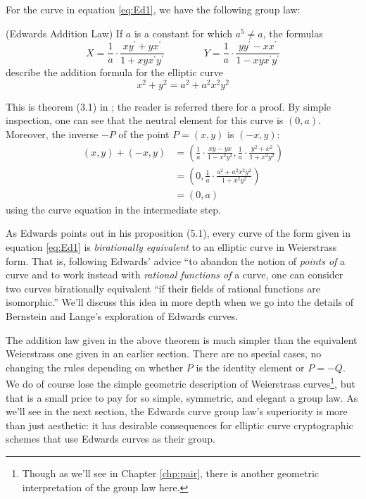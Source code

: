 For the curve in equation \ref{eq:Ed1}, we have the following group law:
\begin{thm}(Edwards Addition Law)
If $a$ is a constant for which $a^5 \ne a$, the formulas
\[
X = \frac{1}{a} \cdot \frac{xy^\prime + yx^\prime}{1 + xyx^\prime y^\prime}
\qquad\qquad
Y = \frac{1}{a} \cdot \frac{yy^\prime - xx^\prime}{1 - xyx^\prime y^\prime}
\]
    describe the addition formula for the elliptic curve 
\[
x^2 + y^2 = a^2 + a^2x^2y^2
\]
\end{thm}
This is theorem (3.1) in \cite{edwards2007normal}; the reader is referred there
    for a proof.
By simple inspection, one can see that the neutral element for this curve is
    $(0, a)$.
Moreover, the inverse $-P$ of the point $P = (x, y)$ is $(-x, y)$:
\begin{align*}
(x, y ) + (-x, y)
    &=  \left( \frac{1}{a} \cdot \frac{xy - yx}{1 - x^2y^2},
               \frac{1}{a} \cdot \frac{y^2 + x^2}{1 + x^2y^2} \right)\\
    &=  \left(0, \frac{1}{a} \cdot \frac{a^2 + a^2x^2y^2}{1 + x^2y^2} \right)\\
    &=  (0, a)
\end{align*}
    using the curve equation in the intermediate step.

As Edwards points out in his proposition (5.1), every curve of the form given
    in equation \ref{eq:Ed1} is \textit{birationally equivalent} to an
    elliptic curve in Weierstrass form.
That is, following Edwards' advice ``to abandon the notion of \textit{points
    of} a curve and to work instead with \textit{rational functions of} a
    curve, one can consider two curves birationally equivalent ``if their
    fields of rational functions are isomorphic.''
We'll discuss this idea in more depth when we go into the details of Bernstein
    and Lange's exploration of Edwards curves.

The addition law given in the above theorem is much simpler than the equivalent
    Weierstrass one given in an earlier section.
There are no special cases, no changing the rules depending on whether $P$ is
    the identity element or $P = -Q$.
We do of course lose the simple geometric description of Weierstrass
    curves\footnote{Though as we'll see in Chapter \ref{chp:pair}, there is
    another geometric interpretation of the group law here.}, but
    that is a small price to pay for so simple, symmetric, and elegant a group
    law.
As we'll see in the next section, the Edwards curve group law's superiority is
    more than just aesthetic: it has desirable consequences for elliptic curve
    cryptographic schemes that use Edwards curves as their group.


